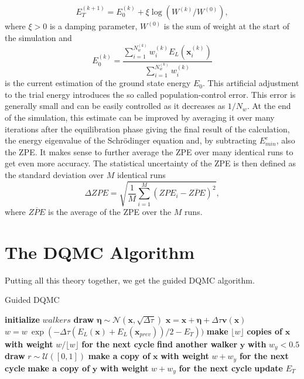 \documentclass [12pt]{report}
\begin{document}
\begin{equation}\label{eq:2.12} 
E_T^{(k+1)} = E_0^{(k)} + \xi \log(W^{(k)}/W^{(0)}),
\end{equation}
where $\xi > 0$ is a damping parameter, $W^{(0)}$ is the sum of weight at the start of the simulation and
\begin{equation}\label{eq:2.13} 
E_0^{(k)} = \frac{\sum_{i = 1}^{N_w^{(k)}} w_{i}^{(k)} E_L(\bm{x}_{i}^{(k)})}{\sum_{i = 1}^{N_w^{(k)}} w_{i}^{(k)} }
\end{equation}
is the current estimation of the ground state energy $E_0$. This artificial adjustment to the trial energy introduces the so called population-control error. This error is generally small and can be easily controlled as it decreases as $1/N_{w}$. At the end of the simulation, this estimate can be improved by averaging it over many iterations after the equilibration phase giving the final result of the calculation, the energy eigenvalue of the Schrödinger equation and, by subtracting $E^e_{min}$, also the ZPE. It makes sense to further average the ZPE over many identical runs to get even more accuracy. The statistical uncertainty of the ZPE is then defined as the standard deviation over $M$ identical runs \cite{herleitung2}
\begin{equation}
\Delta ZPE = \sqrt{\frac{1}{M} \sum_{i=1}^M(ZPE_i - \overline{ZPE})^2},
\end{equation}
where $\overline{ZPE}$ is the average of the ZPE over the $M$ runs.
\newpage
\section{The DQMC Algorithm}
Putting all this theory together, we get the guided DQMC algorithm.
\begin{algorithm}
\caption{Guided DQMC}\label{dqmc}
\begin{algorithmic}[1]
\State \textbf{initialize} $walkers$
		\State \textbf{draw} $\bm{\eta} \sim \mathcal{N}(\bm{x},\sqrt{\Delta \tau})$
		\State $\bm{x} = \bm{x} + \bm{\eta} + \Delta \tau \bm{v}(\bm{x})$ 
		\State $w = w \: \exp{(-\Delta \tau (E_L(\bm{x})+E_L(\bm{x}_{prev}))/2 - E_T))}$
		\State \textbf{make} $\lfloor w \rfloor$ \textbf{copies of} $\bm{x}$ \textbf{with weight} $w/\lfloor w \rfloor$ \textbf{for the next cycle}
		\EndIf
		\State \textbf{find another walker} $\bm{y}$ \textbf{with} $w_y < 0.5$
		\State \textbf{draw} $r \sim \mathcal{U}([0,1])$
		\State \textbf{make a copy of} $\bm{x}$ \textbf{with weight} $w+w_y$ \textbf{for the next cycle}
		\Else
		\State \textbf{make a copy of} $\bm{y}$ \textbf{with weight} $w+w_y$ \textbf{for the next cycle}
		\EndIf
		\EndIf 
	\EndFor
	\State \textbf{update} $E_T$ 
\EndFor 
\EndProcedure
\end{algorithmic}
\end{algorithm}
\newpage
\end{document}

